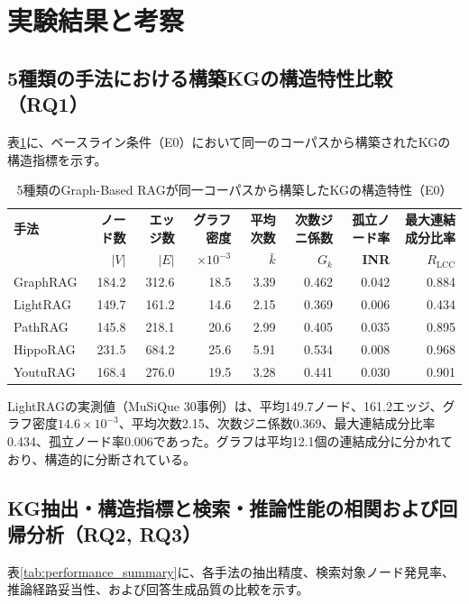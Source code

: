 \documentclass[a4j,dvipdfmx]{jsarticle}
\begin{document}
\section{実験結果と考察}

\subsection{5種類の手法における構築KGの構造特性比較（RQ1）}
表\ref{tab:kg_structure}に、ベースライン条件（E0）において同一のコーパスから構築されたKGの構造指標を示す。

\begin{table}[t]
\centering
\caption{5種類のGraph-Based RAGが同一コーパスから構築したKGの構造特性（E0）}
\label{tab:kg_structure}
\small
\begin{tabular}{l|rrrrrrr}
\textbf{手法} & \textbf{ノード数} & \textbf{エッジ数} & \textbf{グラフ密度} & \textbf{平均次数} & \textbf{次数ジニ係数} & \textbf{孤立ノード率} & \textbf{最大連結成分比率} \\
 & \textbf{$|V|$} & \textbf{$|E|$} & \textbf{$\times 10^{-3}$} & \textbf{$\bar{k}$} & \textbf{$G_k$} & \textbf{INR} & \textbf{$R_{\text{LCC}}$} \\
\hline
GraphRAG & 184.2 & 312.6 & 18.5 & 3.39 & 0.462 & 0.042 & 0.884 \\
LightRAG & 149.7 & 161.2 & 14.6 & 2.15 & 0.369 & 0.006 & 0.434 \\
PathRAG  & 145.8 & 218.1 & 20.6 & 2.99 & 0.405 & 0.035 & 0.895 \\
HippoRAG & 231.5 & 684.2 & 25.6 & 5.91 & 0.534 & 0.008 & 0.968 \\
YoutuRAG & 168.4 & 276.0 & 19.5 & 3.28 & 0.441 & 0.030 & 0.901 \\
\end{tabular}
\end{table}

LightRAGの実測値（MuSiQue 30事例）は、平均149.7ノード、161.2エッジ、グラフ密度$14.6\times10^{-3}$、平均次数2.15、次数ジニ係数0.369、最大連結成分比率0.434、孤立ノード率0.006であった。グラフは平均12.1個の連結成分に分かれており、構造的に分断されている。

\subsection{KG抽出・構造指標と検索・推論性能の相関および回帰分析（RQ2, RQ3）}
表\ref{tab:performance_summary}に、各手法の抽出精度、検索対象ノード発見率、推論経路妥当性、および回答生成品質の比較を示す。
\end{document}
